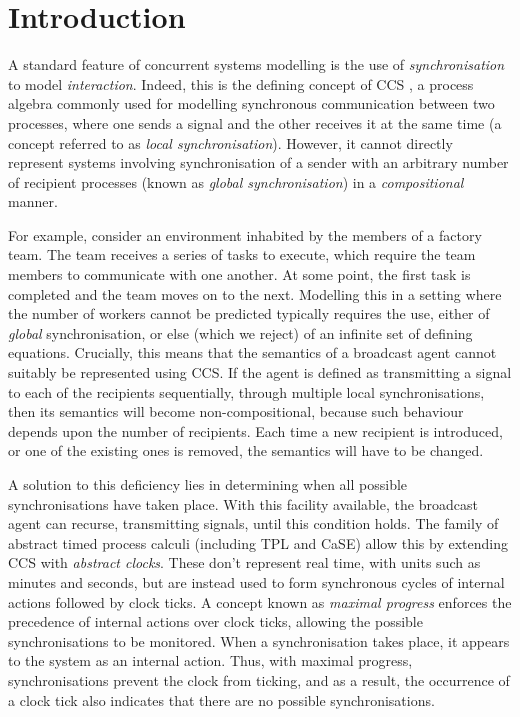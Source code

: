 \chapter{Introduction}
\label{introduction}

A standard feature of concurrent systems modelling is the use of
\emph{synchronisation} to model \emph{interaction}. Indeed, this is the
defining concept of CCS \cite{milner:ccs}, a process algebra commonly
used for modelling synchronous communication between two processes,
where one sends a signal and the other receives it at the same time (a
concept referred to as \emph{local synchronisation}).  However, it
cannot directly represent systems involving synchronisation of a sender
with an arbitrary number of recipient processes (known as \emph{global
synchronisation}) in a \emph{compositional} manner.  

For example, consider an environment inhabited by the members of a
factory team. The team receives a series of tasks to execute, which
require the team members to communicate with one another. At some point,
the first task is completed and the team moves on to the next. Modelling
this in a setting where the number of workers cannot be predicted
typically requires the use, either of \emph{global} synchronisation, or
else (which we reject) of an infinite set of defining equations.
Crucially, this means that the semantics of a broadcast agent cannot
suitably be represented using CCS.  If the agent is defined as
transmitting a signal to each of the recipients sequentially, through
multiple local synchronisations, then its semantics will become
non-compositional, because such behaviour depends upon the number of
recipients.  Each time a new recipient is introduced, or one of the
existing ones is removed, the semantics will have to be changed.

A solution to this deficiency lies in determining when all possible
synchronisations have taken place.  With this facility available, the
broadcast agent can recurse, transmitting signals, until this
condition holds. The family of abstract timed process calculi
(including TPL\cite{hennessy:tpl} and CaSE\cite{CaSE}) allow this by
extending CCS with \emph{abstract clocks}.  These don't represent real
time, with units such as minutes and seconds, but are instead used to
form synchronous cycles of internal actions followed by clock ticks.
A concept known as \emph{maximal progress} enforces the precedence of
internal actions over clock ticks, allowing the possible
synchronisations to be monitored.  When a synchronisation takes place,
it appears to the system as an internal action.  Thus, with maximal
progress, synchronisations prevent the clock from ticking, and as a
result, the occurrence of a clock tick also indicates that there are
no possible synchronisations.

